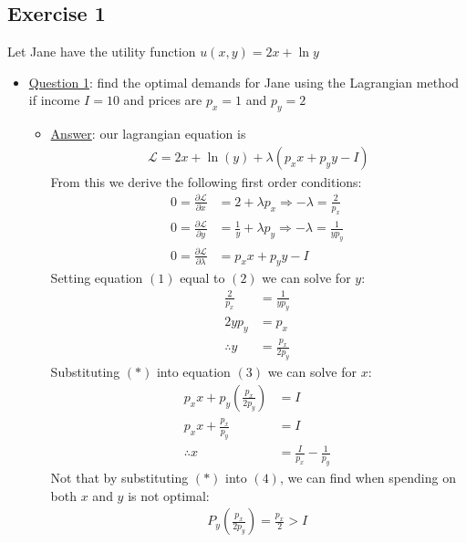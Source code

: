 \documentclass{article}
\begin{document}
\subsection{Exercise 1}
Let Jane have the utility function $u(x,y) = 2x + \ln y$ \par \vspace{0.3em}
\begin{itemize}
  \item  \underline{Question 1}: find the optimal demands for Jane using the Lagrangian method if income $I = 10$ and prices are $p_{x} = 1$ and $p_{y} = 2$
  \begin{itemize}
    \item  \underline{Answer}: our lagrangian equation is
    \begin{gather*}
      \mathcal{L} = 2x + \ln(y) + \lambda (p_{x} x + p_{y}y - I)
    \end{gather*}
    From this we derive the following first order conditions:
    \begin{align*}
      0 = \tfrac{\partial \mathcal{L}}{\partial x} &= 2 + \lambda p_{x} \Rightarrow -\lambda = \frac{2}{p_{x}} \ \tag{1} \\
      0 = \frac{\partial \mathcal{L}}{\partial y} &= \frac{1}{y} + \lambda p_{y} \Rightarrow - \lambda = \tfrac{1}{yp_{y}} \ \tag{2} \\
      0 = \frac{\partial \mathcal{L}}{\partial \lambda} &= p_{x}x + p_{y}y - I \ \tag{3}
    \end{align*}
    Setting equation $(1)$ equal to $(2)$ we can solve for $y$:
    \begin{align*}
      \tfrac{2}{p_{x}} &= \tfrac{1}{y p_{y}} \\
      2y p_{y} &= p_{x} \ \tag{4} \\
      \therefore y &= \tfrac{p_{x}}{2p_{y}} \ \tag{*}
    \end{align*}
    Substituting $(*)$ into equation $(3)$ we can solve for $x$:
    \begin{align*}
      p_{x}x + p_{y}(\tfrac{p_{x}}{2p_{y}}) &= I \\
      p_{x}x + \frac{p_{x}}{p_{y}} &= I \\
      \therefore x &= \frac{I}{p_{x}} - \frac{1}{p_{y}} \ \tag{**}
    \end{align*}
    Not that by substituting $(*)$ into $(4)$, we can find when spending on both $x$ and $y$ is not optimal:
    \begin{gather*}
      P_{y}(\frac{p_{x}}{2p_{y}}) = \frac{p_{x}}{2} > I \ \tag{***}
    \end{gather*}

\end{itemize}
\end{itemize}
\end{document}
